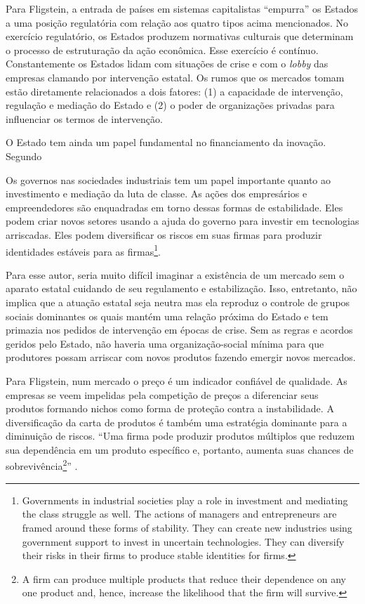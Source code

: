 \documentclass[a4paper, 12pt, openright, oneside, german, french, english, brazil]{abntex2}
\begin{document}
	Para Fligstein, a entrada de países em sistemas capitalistas ``empurra'' os Estados a uma posição regulatória com relação aos quatro tipos acima mencionados. No exercício regulatório, os Estados produzem normativas culturais que determinam o processo de estruturação da ação econômica. Esse exercício é contínuo. Constantemente os Estados lidam com situações de crise e com o \textit{lobby} das empresas clamando por intervenção estatal. Os rumos que os mercados tomam estão diretamente relacionados a dois fatores: (1) a capacidade de intervenção, regulação e mediação do Estado e (2) o poder de organizações privadas para influenciar os termos de intervenção.

	O Estado tem ainda um papel fundamental no financiamento da inovação. Segundo 

	\begin{citacao}
		Os governos nas sociedades industriais tem um papel importante quanto ao investimento e mediação da luta de classe. As ações dos empresários e empreendedores são enquadradas em torno dessas formas de estabilidade. Eles podem criar novos setores usando a ajuda do governo para investir em tecnologias arriscadas. Eles podem diversificar os riscos em suas firmas para produzir identidades estáveis para as firmas\footnote{Governments in industrial societies play a role in investment and mediating the class struggle as well. The actions of managers and entrepreneurs are framed around these forms of stability. They can create new industries using government support to invest in uncertain technologies. They can diversify their risks in their firms to produce stable identities for firms.}. \cite[p. 62]{fligstein2002architecture}
	\end{citacao}

	Para esse autor, seria muito difícil imaginar a existência de um mercado sem o aparato estatal cuidando de seu regulamento e estabilização. Isso, entretanto, não implica que a atuação estatal seja neutra mas ela reproduz o controle de grupos sociais dominantes os quais mantém uma relação próxima do Estado e tem primazia nos pedidos de intervenção em épocas de crise. Sem as regras e acordos geridos pelo Estado, não haveria uma organização-social mínima para que produtores possam arriscar com novos produtos fazendo emergir novos mercados.

	Para Fligstein, num mercado o preço é um indicador confiável de qualidade. As empresas se veem impelidas pela competição de preços a diferenciar seus produtos formando nichos como forma de proteção contra a instabilidade. A diversificação da carta de produtos é também uma estratégia dominante para a diminuição de riscos. ``Uma firma pode produzir produtos múltiplos que reduzem sua dependência em um produto específico e, portanto, aumenta suas chances de sobrevivência\footnote{A firm can produce multiple products that reduce their dependence on any one product and, hence, increase the likelihood that the firm will survive.}'' .
\end{document}
